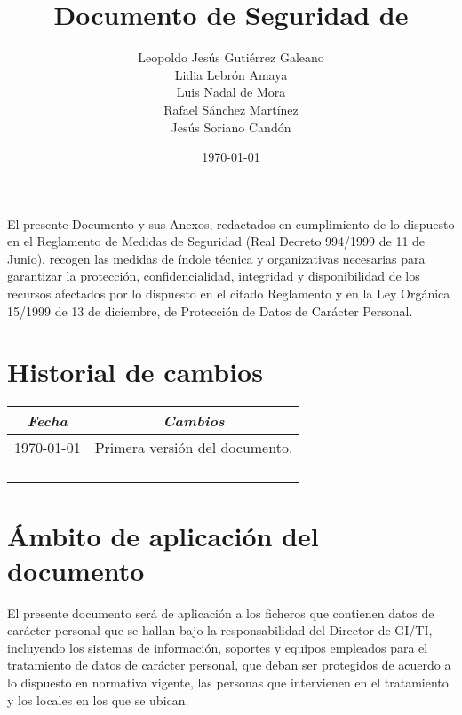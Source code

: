 \documentclass[a4paper,11pt,bibtotoc,noliststotoc]{scrbook}
\title{Documento de Seguridad de \laorganizacion}
\author{Leopoldo Jesús Gutiérrez Galeano\\Lidia Lebrón Amaya\\Luis Nadal de Mora\\Rafael Sánchez Martínez\\Jesús Soriano Candón}
\date{\today}
\newcommand{\cellcenter}[1]{\multicolumn{1}{c}{#1}}
\newcommand{\thead}[1]{\textbf{\emph{#1}}}
\begin{document}
\begin{titlepage}
  \maketitle
\end{titlepage}

\frontmatter
\pagestyle{empty}

El presente Documento y sus Anexos, redactados en cumplimiento de lo dispuesto en el Reglamento de Medidas de Seguridad (Real Decreto 994/1999 de 11 de Junio), recogen las medidas de índole técnica y organizativas necesarias para garantizar la protección, confidencialidad, integridad y disponibilidad de los recursos afectados por lo dispuesto en el citado Reglamento y en la Ley Orgánica 15/1999 de 13 de diciembre, de Protección de Datos de Carácter Personal.


\tableofcontents
\listoftables

\chapter{Historial de cambios}

\begin{center}
  \centering
  \begin{tabular}{|m{}|m{}|}
    \cellcenter{\thead{Fecha}} & \cellcenter{\thead{Cambios}} \\
    \hline
    \today & Primera versión del documento. \\ \hline
    &  \\ \hline
    &  \\ \hline
    &  \\ \hline
    &  \\ \hline
  \end{tabular}
\end{center}



\mainmatter
\pagestyle{scrheadings}




\chapter{Ámbito de aplicación del documento}

El presente documento será de aplicación a los ficheros que contienen datos de carácter personal que se hallan bajo la responsabilidad del Director de GI/TI, incluyendo los sistemas de información, soportes y equipos empleados para el tratamiento de datos de carácter personal, que deban ser protegidos de acuerdo a lo dispuesto en normativa vigente, las personas que intervienen en el tratamiento y los locales en los que se ubican.
\end{document}
